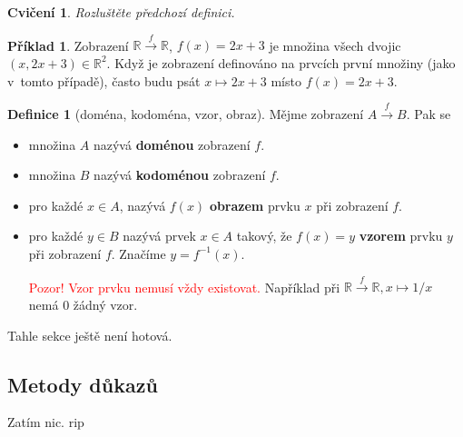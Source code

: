 \documentclass[a4paper,11pt]{article}
\theoremstyle{definition}
\newtheorem{exm}[thm]{Příklad}
\newtheorem{dfn}[thm]{Definice}
\theoremstyle{plain}
\newtheorem*{exr}{Cvičení}
\newcommand{\R}{\mathbb{R}}
\begin{document}
\begin{exr}
 Rozluštěte předchozí definici.
\end{exr}

\begin{exm}
 Zobrazení $\R  \overset{f}{\longrightarrow} \R$, $f(x) = 2x + 3$ je množina
 všech dvojic $(x,2x+3) \in \R^2$. Když je zobrazení definováno na prvcích první
 množiny (jako v~tomto případě), často budu psát $x \mapsto 2x + 3$ místo $f(x)
 = 2x + 3$.
\end{exm}

\begin{dfn}[doména, kodoména, vzor, obraz]
 Mějme zobrazení $A \overset{f}{\longrightarrow} B$. Pak se
 \begin{itemize}
  \item množina $A$ nazývá \textbf{doménou} zobrazení $f$.
  \item množina $B$ nazývá \textbf{kodoménou} zobrazení $f$.
  \item pro každé $x \in A$, nazývá $f(x)$ \textbf{obrazem} prvku $x$ při
   zobrazení $f$.
  \item pro každé $y \in B$ nazývá prvek $x \in A$ takový, že $f(x) = y$ 
   \textbf{vzorem} prvku $y$ při zobrazení $f$. Značíme $y =
   f^{-1}(x)$.

   \textcolor{red}{Pozor! Vzor prvku nemusí vždy existovat.} Například při $\R
   \overset{f}{ \to } \R, x \mapsto 1 / x$ nemá $0$ žádný vzor.
 \end{itemize}
\end{dfn}

Tahle sekce ještě není hotová.

\subsection{Metody důkazů}
\label{ssec:metody-dukazu}

Zatím nic. rip
\end{document}
